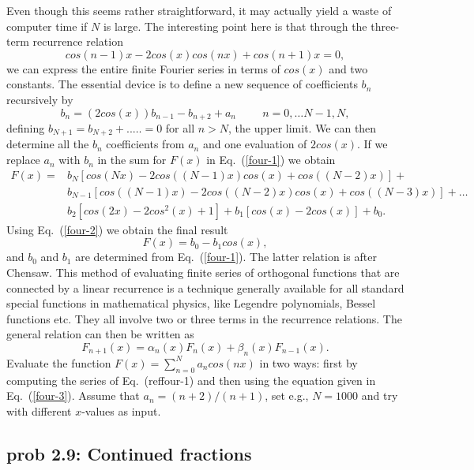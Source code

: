 Even though this seems rather straightforward, it may
actually yield a waste of computer time if $N$ is large.
The interesting point here is that through the three-term
recurrence relation
%
\begin{equation}
cos(n-1)x-2cos(x)cos(nx)+cos(n+1)x=0,
\label{four-2}
\end{equation}
%
we can express the entire finite Fourier series in terms
of $cos(x)$ and two constants. The essential device is
to define a new sequence of coefficients 
$b_n$ recursively by
%
\begin{equation}
b_n=(2cos(x))b_{n-1}-b_{n+2}+a_n \hspace{1cm} n=0,\dots N-1, N,
\label{four-3}
\end{equation}
%
defining $b_{N+1}=b_{N+2}+..\dots=0$ for all $n>N$, the upper limit.
We can then determine all the $b_n$ coefficients from $a_n$ and one evaluation
of $2cos(x)$. If we replace $a_n$ with $b_n$ in the sum for $F(x)$ 
in Eq.~(\ref{four-1}) we obtain 
%
\begin{eqnarray}
    F(x)=&b_N\left[cos(Nx)-2cos((N-1)x)cos(x)+cos((N-2)x)\right]  + \nonumber\\
       &b_{N-1}\left[cos((N-1)x)-2cos((N-2)x)cos(x)+cos((N-3)x)\right]  +\dots \nonumber\\
   &b_2\left[cos(2x)-2cos^2(x)+1\right]  + b_1\left[cos(x)-2cos(x)\right]+b_0.
\end{eqnarray}  
%
Using Eq.~(\ref{four-2}) we obtain the final result
\begin{equation}
    F(x)=b_0-b_1cos(x),
 \label{four-4}
\end{equation}
%
and $b_0$ and $b_1$ are determined from Eq.~(\ref{four-1}). 
The latter relation is after Chensaw. 
This method of evaluating finite series of orthogonal functions that are connected by a linear recurrence is a technique generally available for all standard
special functions in mathematical physics, like Legendre polynomials,
Bessel functions etc. They all involve two or three terms in the recurrence
relations. The general relation can then be written as 
\[
   F_{n+1}(x)=\alpha_n(x)F_n(x)+\beta_n(x)F_{n-1}(x).
\]
Evaluate the function $F(x)=\sum_{n=0}^{N}a_n cos(nx)$
in two ways: first by computing the series of Eq.~(ref{four-1})
and then using the equation given in Eq.~(\ref{four-3}).
Assume that $a_n=(n+2)/(n+1)$, set e.g., $N=1000$ and try with different
$x$-values as input.




\subsection*{prob 2.9: Continued fractions}

